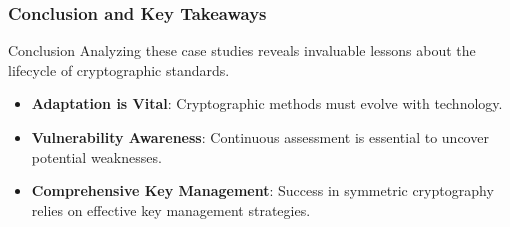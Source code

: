 \documentclass{beamer}
\begin{document}
\begin{frame}[fragile]
    \frametitle{Conclusion and Key Takeaways}
    \begin{block}{Conclusion}
        Analyzing these case studies reveals invaluable lessons about the lifecycle of cryptographic standards.
    \end{block}
    \begin{itemize}
        \item \textbf{Adaptation is Vital}: Cryptographic methods must evolve with technology.
        \item \textbf{Vulnerability Awareness}: Continuous assessment is essential to uncover potential weaknesses.
        \item \textbf{Comprehensive Key Management}: Success in symmetric cryptography relies on effective key management strategies.
    \end{itemize}
\end{frame}
\end{document}
